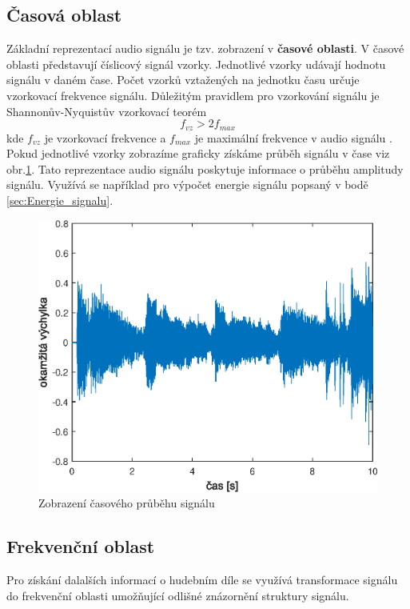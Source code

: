   \subsection{Časová oblast}
  Základní reprezentací audio signálu je tzv. zobrazení v \textbf{časové oblasti}.
  V časové oblasti představují číslicový signál vzorky. Jednotlivé vzorky udávají hodnotu signálu v daném čase.
  Počet vzorků vztažených na jednotku času určuje vzorkovací frekvence signálu.
  Důležitým pravidlem pro vzorkování signálu je Shannonův-Nyquistův vzorkovací teorém
  \begin{equation}
    f_{vz} > 2f_{max}
    \label{rov:vzorkovaci_teorem}
  \end{equation}
  kde $f_{vz}$ je vzorkovací frekvence a $f_{max}$ je maximální frekvence v audio signálu \cite{bracewell1978fourier}.  
  Pokud jednotlivé vzorky zobrazíme graficky získáme průběh signálu v čase viz obr.\ref{fig:Waveform}. Tato reprezentace audio signálu poskytuje informace o průběhu amplitudy signálu. Využívá se například pro výpočet energie signálu popsaný v bodě \ref{sec:Energie_signalu}.

  \begin{figure}[H]
    \centering
    \includegraphics[width = 0.8\linewidth]{obrazky/Waveform.eps}
    \caption{Zobrazení časového průběhu signálu}
    \label{fig:Waveform}
  \end{figure}
  
  \subsection{Frekvenční oblast} \label{sec:FT}
  Pro získání dalalších informací o hudebním díle se využívá transformace signálu do frekvenční oblasti umožňující odlišné znázornění struktury signálu.

